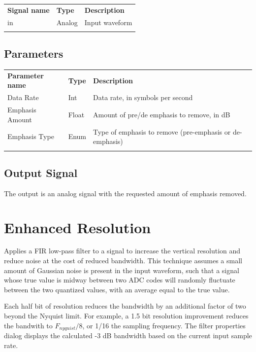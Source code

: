 \begin{tabularx}{16cm}{llX}
\thickhline
\textbf{Signal name} & \textbf{Type} & \textbf{Description} \\
\thickhline
in & Analog & Input waveform\\
\thickhline
\end{tabularx}

\subsection{Parameters}

\begin{tabularx}{16cm}{llX}
\thickhline
\textbf{Parameter name} & \textbf{Type} & \textbf{Description} \\
\thickhline
Data Rate & Int & Data rate, in symbols per second\\
\thinhline
Emphasis Amount & Float & Amount of pre/de emphasis to remove, in dB\\
\thinhline
Emphasis Type & Enum & Type of emphasis to remove (pre-emphasis or de-emphasis) \\
\thickhline
\end{tabularx}

\subsection{Output Signal}

The output is an analog signal with the requested amount of emphasis removed.

\pagebreak
\section{Enhanced Resolution}
\label{filter:eres}

Applies a FIR low-pass filter to a signal to increase the vertical resolution and reduce noise at the cost of reduced
bandwidth. This technique assumes a small amount of Gaussian noise is present in the input waveform, such that a signal
whose true value is midway between two ADC codes will randomly fluctuate between the two quantized values, with an
average equal to the true value.

Each half bit of resolution reduces the bandwidth by an additional factor of two beyond the Nyquist limit. For example,
a 1.5 bit resolution improvement reduces the bandwith to $F_{nyquist} / 8$, or 1/16 the sampling frequency. The filter
properties dialog displays the calculated -3 dB bandwidth based on the current input sample rate.

